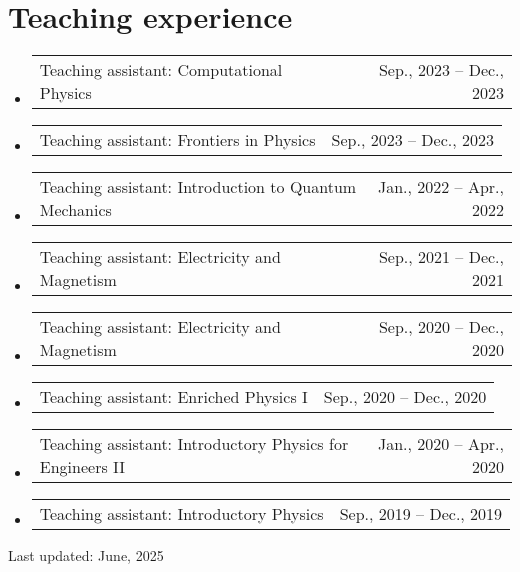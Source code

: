 \documentclass[letterpaper,11pt]{article}
\makeatletter
\newcommand{\TeachingItem}[2]{
	\item{\vspace{-1pt}
		\begin{tabular*}{0.92\textwidth}{l@{\extracolsep{\fill}}r}
			{#1} & {#2}
		\end{tabular*}
		\vspace{-5pt}
	}
}
\makeatother
\begin{document}
\section*{Teaching experience}
\begin{itemize}[leftmargin=*]
	\TeachingItem{Teaching assistant: Computational Physics}{Sep., 2023 -- Dec., 2023}
	\TeachingItem{Teaching assistant: Frontiers in Physics}{Sep., 2023 -- Dec., 2023}
	\TeachingItem{Teaching assistant: Introduction to Quantum Mechanics}{Jan., 2022 -- Apr., 2022}
	\TeachingItem{Teaching assistant: Electricity and Magnetism}{Sep., 2021 -- Dec., 2021}
	\TeachingItem{Teaching assistant: Electricity and Magnetism}{Sep., 2020 -- Dec., 2020}
	\TeachingItem{Teaching assistant: Enriched Physics I}{Sep., 2020 -- Dec., 2020}
	\TeachingItem{Teaching assistant: Introductory Physics for Engineers II}{Jan., 2020 -- Apr., 2020}
	\TeachingItem{Teaching assistant: Introductory Physics}{Sep., 2019 -- Dec., 2019}
\end{itemize}

\vspace{1cm}

\begin{flushright}
	Last updated: June, 2025
\end{flushright}
\end{document}
